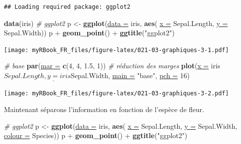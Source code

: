 \documentclass[twoside,symmetric]{book}
\newenvironment{Shaded}{}{}
\newcommand{\CommentTok}[1]{\textit{#1}}
\newcommand{\DataTypeTok}[1]{\underline{#1}}
\newcommand{\DecValTok}[1]{#1}
\newcommand{\FloatTok}[1]{#1}
\newcommand{\KeywordTok}[1]{\textbf{#1}}
\newcommand{\NormalTok}[1]{#1}
\newcommand{\OperatorTok}[1]{#1}
\newcommand{\StringTok}[1]{#1}
\begin{document}
\begin{verbatim}
## Loading required package: ggplot2
\end{verbatim}

\begin{Shaded}
\begin{Highlighting}[]
\KeywordTok{data}\NormalTok{(iris)}
\CommentTok{# ggplot2}
\NormalTok{p <-}\StringTok{ }\KeywordTok{ggplot}\NormalTok{(}\DataTypeTok{data =}\NormalTok{ iris, }\KeywordTok{aes}\NormalTok{(}
  \DataTypeTok{x =}\NormalTok{ Sepal.Length, }
  \DataTypeTok{y =}\NormalTok{ Sepal.Width))}
\NormalTok{p }\OperatorTok{+}\StringTok{ }\KeywordTok{geom_point}\NormalTok{() }\OperatorTok{+}\StringTok{ }\KeywordTok{ggtitle}\NormalTok{(}\StringTok{"ggplot2"}\NormalTok{)}
\end{Highlighting}
\end{Shaded}

\texttt{[image: myRBook\_FR\_files/figure-latex/021-03-graphiques-3-1.pdf]}

\begin{Shaded}
\begin{Highlighting}[]
\CommentTok{# base}
\KeywordTok{par}\NormalTok{(}\DataTypeTok{mar =} \KeywordTok{c}\NormalTok{(}\DecValTok{4}\NormalTok{, }\DecValTok{4}\NormalTok{, }\FloatTok{1.5}\NormalTok{, }\DecValTok{1}\NormalTok{)) }\CommentTok{# réduction des marges}
\KeywordTok{plot}\NormalTok{(}\DataTypeTok{x =}\NormalTok{ iris}\OperatorTok{$}\NormalTok{Sepal.Length, }\DataTypeTok{y =}\NormalTok{ iris}\OperatorTok{$}\NormalTok{Sepal.Width, }
  \DataTypeTok{main =} \StringTok{"base"}\NormalTok{, }\DataTypeTok{pch =} \DecValTok{16}\NormalTok{)}
\end{Highlighting}
\end{Shaded}

\texttt{[image: myRBook\_FR\_files/figure-latex/021-03-graphiques-3-2.pdf]}

Maintenant séparons l'information en fonction de l'espèce de fleur.

\begin{Shaded}
\begin{Highlighting}[]
\CommentTok{# ggplot2}
\NormalTok{p <-}\StringTok{ }\KeywordTok{ggplot}\NormalTok{(}\DataTypeTok{data =}\NormalTok{ iris, }\KeywordTok{aes}\NormalTok{(}
  \DataTypeTok{x =}\NormalTok{ Sepal.Length, }
  \DataTypeTok{y =}\NormalTok{ Sepal.Width, }
  \DataTypeTok{colour =}\NormalTok{ Species))}
\NormalTok{p }\OperatorTok{+}\StringTok{ }\KeywordTok{geom_point}\NormalTok{() }\OperatorTok{+}\StringTok{ }\KeywordTok{ggtitle}\NormalTok{(}\StringTok{"ggplot2"}\NormalTok{)}
\end{Highlighting}
\end{Shaded}
\end{document}
